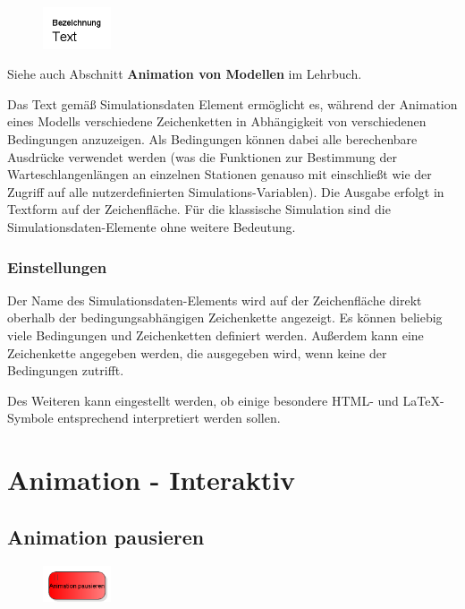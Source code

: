 \begin{figure}
\vspace{-22pt}
\includegraphics[width=2cm]{imageModelElementAnimationTextSelect.png}
\vspace{-22pt}
\end{figure}

Siehe auch Abschnitt \textbf{Animation von Modellen} im Lehrbuch.

Das Text gemäß Simulationsdaten Element ermöglicht es, während der Animation eines Modells verschiedene
Zeichenketten in Abhängigkeit von verschiedenen Bedingungen anzuzeigen. Als Bedingungen können dabei
alle berechenbare Ausdrücke verwendet werden (was die Funktionen zur Bestimmung der Warteschlangenlängen
an einzelnen Stationen genauso mit einschließt wie der Zugriff auf alle nutzerdefinierten Simulations-Variablen).
Die Ausgabe erfolgt in Textform auf der Zeichenfläche. Für die klassische Simulation sind die Simulationsdaten-Elemente
ohne weitere Bedeutung.

\subsection*{Einstellungen}

Der Name des Simulationsdaten-Elements wird auf der Zeichenfläche direkt oberhalb der bedingungsabhängigen Zeichenkette angezeigt.
Es können beliebig viele Bedingungen und Zeichenketten definiert werden.
Außerdem kann eine Zeichenkette angegeben werden, die ausgegeben wird, wenn keine der Bedingungen zutrifft.

Des Weiteren kann eingestellt werden, ob einige besondere HTML- und LaTeX-Symbole entsprechend
interpretiert werden sollen.





\chapter{Animation - Interaktiv}

\section{Animation pausieren}
\label{ref:ModelElementAnimationPause}

\begin{figure}
\vspace{-22pt}
\includegraphics[width=2cm]{imageModelElementAnimationPause.png}
\vspace{-22pt}
\end{figure}


